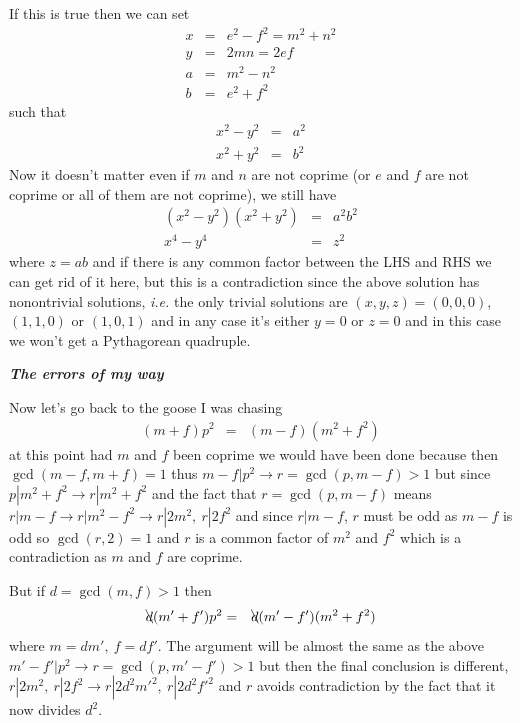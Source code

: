 \documentclass[aps,preprint,preprintnumbers,nofootinbib,showpacs,prd]{revtex4-1}
\newcommand{\ie}{{\it i.e.} }
\newcommand{\nbea}{\begin{eqnarray*}}
\newcommand{\neea}{\end{eqnarray*}}
\begin{document}
If this is true then we can set
%
\nbea
x & = & e^2 - f^2 = m^2 + n^2 \\
y & = & 2mn = 2ef \\
a & = &  m^2 - n^2 \\
b & = & e ^2 + f^2
\neea
%
such that
%
\nbea
x^2 - y^2 & = & a^2 \\
x^2 + y^2 & = & b^2
\neea
%
Now it doesn't matter even if $m$ and $n$ are not coprime (or $e$ and $f$ are not coprime or all of them are not coprime), we still have
%
\nbea
(x^2 - y^2)(x^2 + y^2) & = & a^2b^2 \\
x^4 - y^4 & = & z^2
\neea
%
where $z = ab$ and if there is any common factor between the LHS and RHS we can get rid of it here, but this is a contradiction since the above solution has nonontrivial solutions, \ie the only trivial solutions are $(x,y,z) = (0,0,0)$, $(1,1,0)$ or $(1,0,1)$ and in any case it's either $y = 0$ or $z = 0$ and in this case we won't get a Pythagorean quadruple.

\bigskip
\textit{\textbf{The errors of my way}}
\smallskip

Now let's go back to the goose I was chasing
%
\nbea
(m + f)p^2 & = & (m-f)(m^2+f^2)
\neea
%
at this point had $m$ and $f$ been coprime we would have been done because then $\gcd(m-f ,m+f)=1$ thus $m-f|p^2 \to r = \gcd(p,m-f) > 1$ but since $p|m^2+f^2 \to r | m^2+f^2$ and the fact that $r = \gcd(p,m-f)$ means $r | m-f \to r | m^2 - f^2 \to r |2m^2, ~r|2f^2$ and since $r | m-f$, $r$ must be odd as $m-f$ is odd so $\gcd(r,2)=1$ and $r$ is a common factor of $m^2$ and $f^2$ which is a contradiction as $m$ and $f$ are coprime.

But if $d = \gcd(m,f) > 1$ then
%
\nbea
\bcancel{d}(m' + f')p^2 & = & \bcancel{d}(m'-f')(m^2+f^2)
\neea
%
where $m = dm',~f = df'$. The argument will be almost the same as the above $m'-f'|p^2 \to r = \gcd(p,m'-f') > 1$ but then the final conclusion is different, $r | 2m^2,~r|2f^2 \to r | 2d^2m'^2,~r|2d^2f'^2$ and $r$ avoids contradiction by the fact that it now divides $d^2$.
\end{document}
